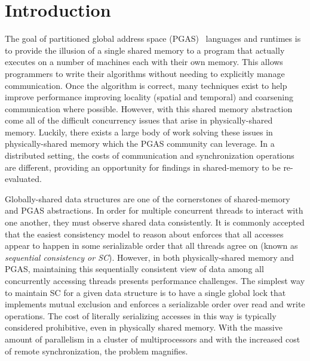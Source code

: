 \section{Introduction}

The goal of partitioned global address space (PGAS)~\cite{upc:2005} languages and runtimes is to provide the illusion of a single shared memory to a program that actually executes on a number of machines each with their own memory. This allows programmers to write their algorithms without needing to explicitly manage communication. Once the algorithm is correct, many techniques exist to help improve performance improving locality (spatial and temporal) and coarsening communication where possible. However, with this shared memory abstraction come all of the difficult concurrency issues that arise in physically-shared memory. Luckily, there exists a large body of work solving these issues in physically-shared memory which the PGAS community can leverage. In a distributed setting, the costs of communication and synchronization operations are different, providing an opportunity for findings in shared-memory to be re-evaluated.

Globally-shared data structures are one of the cornerstones of shared-memory and PGAS abstractions. 
In order for multiple concurrent threads to interact with one another, they must observe shared data consistently. It is commonly accepted that the easiest consistency model to reason about enforces that all accesses appear to happen in some serializable order that all threads agree on (known as \emph{sequential consistency or SC}).
However, in both physically-shared memory and PGAS, maintaining this sequentially consistent view of data among all concurrently accessing threads presents performance challenges.
The simplest way to maintain SC for a given data structure is to have a single global lock that implements mutual exclusion and enforces a serializable order over read and write operations. The cost of literally serializing accesses in this way is typically considered prohibitive, even in physically shared memory.
With the massive amount of parallelism in a cluster of multiprocessors and with the increased cost of remote synchronization, the problem magnifies.

